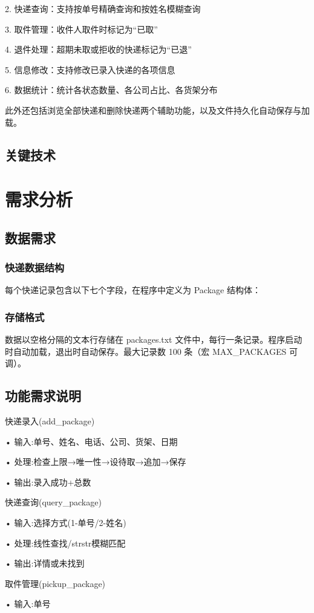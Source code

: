 2. 快递查询：支持按单号精确查询和按姓名模糊查询

3. 取件管理：收件人取件时标记为“已取”

4. 退件处理：超期未取或拒收的快递标记为“已退”

5. 信息修改：支持修改已录入快递的各项信息

6. 数据统计：统计各状态数量、各公司占比、各货架分布

此外还包括浏览全部快递和删除快递两个辅助功能，以及文件持久化自动保存与加载。

\subsection{关键技术}
\section{需求分析}
\subsection{数据需求}
\subsubsection{快递数据结构}
每个快递记录包含以下七个字段，在程序中定义为 Package 结构体：

\subsubsection{存储格式}
数据以空格分隔的文本行存储在 packages.txt 文件中，每行一条记录。程序启动时自动加载，退出时自动保存。最大记录数 100 条（宏 MAX\_PACKAGES 可调）。

\subsection{功能需求说明}
快递录入(add\_package)

• 输入:单号、姓名、电话、公司、货架、日期

• 处理:检查上限→唯一性→设待取→追加→保存

• 输出:录入成功+总数

快递查询(query\_package)

• 输入:选择方式(1-单号/2-姓名)

• 处理:线性查找/strstr模糊匹配

• 输出:详情或未找到

取件管理(pickup\_package)

• 输入:单号

